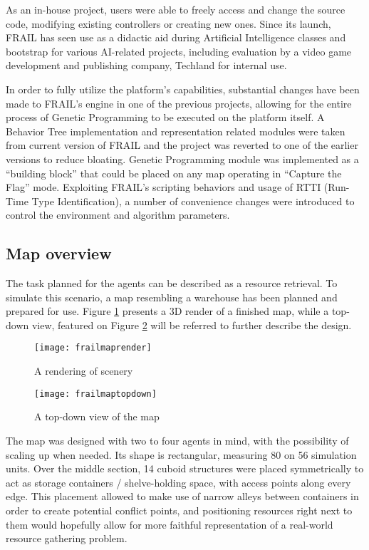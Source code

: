 As an in-house project, users were able to freely access and change the source code, modifying existing controllers or creating new ones. Since its launch, FRAIL has seen use as a didactic aid during Artificial Intelligence classes and bootstrap for various AI-related projects, including evaluation by a video game development and publishing company, Techland for internal use. %

In order to fully utilize the platform's capabilities, substantial changes have been made to FRAIL's engine in one of the previous projects, allowing for the entire process of Genetic Programming to be executed on the platform itself. A Behavior Tree implementation and representation related modules were taken from current version of FRAIL and the project was reverted to one of the earlier versions to reduce bloating. Genetic Programming module was implemented as a ``building block'' that could be placed on any map operating in ``Capture the Flag'' mode. Exploiting FRAIL's scripting behaviors and usage of RTTI (Run-Time Type Identification), a number of convenience changes were introduced to control the environment and algorithm parameters.
\subsection{Map overview}
The task planned for the agents can be described as a resource retrieval. To simulate this scenario, a map resembling a warehouse has been planned and prepared for use. Figure \ref{fig:x simmaprender} presents a 3D render of a finished map, while a top-down view, featured on Figure \ref{fig:x simmaptopdown} will be referred to further describe the design.

\begin{figure}[h]
    \centering
    \texttt{[image: frailmaprender]}
    \caption{A rendering of scenery}
    \label{fig:x simmaprender}
\end{figure}

\begin{figure}[h]
    \centering
    \texttt{[image: frailmaptopdown]}
    \caption{A top-down view of the map}
    \label{fig:x simmaptopdown}
\end{figure}

The map was designed with two to four agents in mind, with the possibility of scaling up when needed. Its shape is rectangular, measuring 80 on 56 simulation units. Over the middle section, 14 cuboid structures were placed symmetrically to act as storage containers / shelve-holding space, with access points along every edge. This placement allowed to make use of narrow alleys between containers in order to create potential conflict points, and positioning resources right next to them would hopefully allow for more faithful representation of a real-world resource gathering problem.
